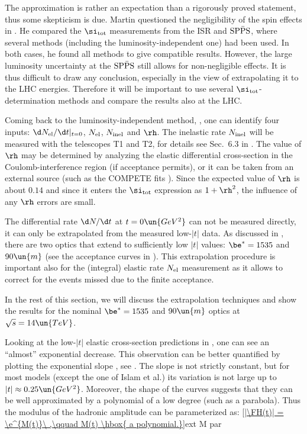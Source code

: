 The approximation  is rather an expectation than a rigorously proved statement, thus some skepticism is due. Martin questioned the negligibility of the spin effects in . He compared the $\si_{\rm tot}$ measurements from the ISR and $\rm SP\bar PS$, where several methods (including the luminosity-independent one) had been used. In both cases, he found all methods to give compatible results. However, the large luminosity uncertainty at the $\rm SP\bar PS$ still allows for non-negligible effects. It is thus difficult to draw any conclusion, especially in the view of extrapolating it to the LHC energies. Therefore it will be important to use several $\si_{\rm tot}$-determination methods and compare the results also at the LHC.

Coming back to the luminosity-independent method, , one can identify four inputs: $\d N_{\rm el}/\d t|_{t=0}$, $N_{\rm el}$, $N_{\rm inel}$ and $\rh$. The inelastic rate $N_{\rm inel}$ will be measured with the telescopes T1 and T2, for details see Sec.~6.3 in . The value of $\rh$ may be determined by analyzing the elastic differential cross-section in the Coulomb-interference region (if acceptance permits), or it can be taken from an external source (such as the COMPETE fits ). Since the expected value of $\rh$ is about $0.14$ and since it enters the $\si_{\rm tot}$ expression as $1 + \rh^2$, the influence of any $\rh$ errors are small.

The differential rate $\d N/\d t$ at $t=0\un{GeV^2}$ can not be measured directly, it can only be extrapolated from the measured low-$|t|$ data. As discussed in , there are two optics that extend to sufficiently low $|t|$ values: $\be^* = 1535$ and $90\un{m}$ (see the acceptance curves in ). This extrapolation procedure is important also for the (integral) elastic rate $N_{\rm el}$ measurement as it allows to correct for the events missed due to the finite acceptance.

In the rest of this section, we will discuss the extrapolation techniques and show the results for the nominal $\be^* = 1535$ and $90\un{m}$ optics at $\sqrt s = 14\un{TeV}$.

Looking at the low-$|t|$ elastic cross-section predictions in , one can see an ``almost'' exponential decrease. This observation can be better quantified by plotting the exponential slope , see . The slope is not strictly constant, but for most models (except the one of Islam et al.) its variation is not large up to $|t| \approx 0.25\un{GeV^2}$. Moreover, the shape of the curves suggests that they can be well approximated by a polynomial of a low degree (such as a parabola). Thus the modulus of the hadronic amplitude can be parameterized as:
\eqref{|\FH(t)| = \e^{M(t)}\ ,\qquad M(t) \hbox{ a polynomial.}}{ext M par}

